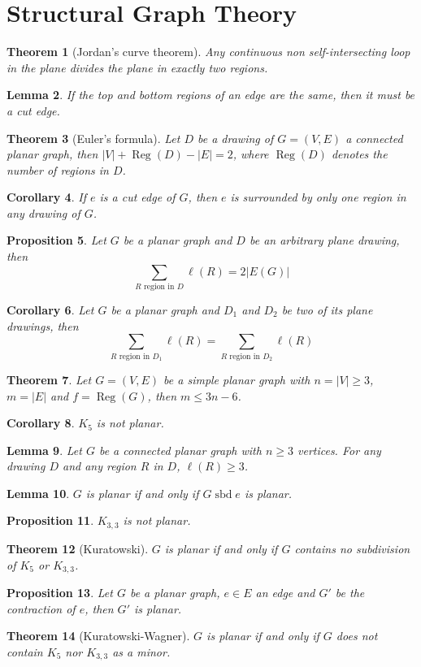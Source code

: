 \documentclass[paper=a4, fontsize=12pt]{scrartcl} %
\newtheorem{thm}{Theorem}[section]
\newtheorem{cor}[thm]{Corollary}
\newtheorem{prop}[thm]{Proposition}
\newtheorem{lem}[thm]{Lemma}
\theoremstyle{definition}
\theoremstyle{remark}
\DeclareMathOperator{\reg}{Reg}
\DeclareMathOperator{\sbd}{sbd}
\numberwithin{equation}{section} %
\numberwithin{figure}{section} %
\numberwithin{table}{section} %
\begin{document}
\section{Structural Graph Theory}
\begin{thm}[Jordan's curve theorem]
	Any continuous non self-intersecting loop in the plane divides the plane in exactly two regions.
\end{thm}
\begin{lem}
	If the top and bottom regions of an edge are the same, then it must be a cut edge.
\end{lem}
\begin{thm}[Euler's formula]
	Let $D$ be a drawing of $G = (V,E)$ a connected planar graph, then $|V| + \reg(D) - |E| = 2$, where $\reg(D)$ denotes the number of regions in $D$.
\end{thm}
\begin{cor}
	If $e$ is a cut edge of $G$, then $e$ is surrounded by only one region in any drawing of $G$.
\end{cor}
\begin{prop}
	Let $G$ be a planar graph and $D$ be an arbitrary plane drawing, then
	\[ \sum_{R \mbox{ region in } D} \ell(R) = 2|E(G)| \]
\end{prop}
\begin{cor}
	Let $G$ be a planar graph and $D_1$ and $D_2$ be two of its plane drawings, then
	\[ \sum_{R \mbox{ region in } D_1} \ell(R) = \sum_{R \mbox{ region in } D_2} \ell(R)\]
\end{cor}
\begin{thm}
	Let $G= (V,E)$ be a simple planar graph with $n = |V| \geq 3$, $m = |E|$ and $f = \reg(G)$, then $m \leq 3n-6$.
\end{thm}
\begin{cor}
	$K_5$ is not planar.
\end{cor}
\begin{lem}
	Let $G$ be a connected planar graph with $n \geq 3$ vertices. For any drawing $D$ and any region $R$ in $D$, $\ell(R) \geq 3$.
\end{lem}
\begin{lem}
	$G$ is planar if and only if $G \sbd e$ is planar.
\end{lem}
\begin{prop}
	$K_{3,3}$ is not planar.
\end{prop}
\begin{thm}[Kuratowski]
	$G$ is planar if and only if $G$ contains no subdivision of $K_5$ or $K_{3,3}$.
\end{thm}
\begin{prop}
	Let $G$ be a planar graph, $e \in E$ an edge and $G'$ be the contraction of $e$, then $G'$ is planar.
\end{prop}
\begin{thm}[Kuratowski-Wagner]
	$G$ is planar if and only if $G$ does not contain $K_5$ nor $K_{3,3}$ as a minor.
\end{thm}
\end{document}
